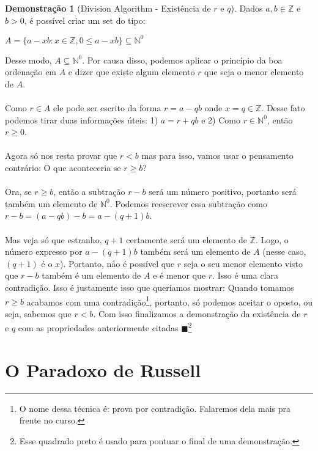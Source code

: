\documentclass[a4paper,11pt]{book}
\theoremstyle{definition}
\newtheorem{demonstration}{Demonstração}[section]
\begin{document}
\begin{demonstration}[Division Algorithm - Existência de $r$ e $q$]
Dados $a,b \in \mathbb{Z}$ e $b > 0$, é possível criar um set do tipo:
\begin{center}
	$ A = \{ a - xb : x \in \mathbb{Z}, 0 \leq a - xb \} \subseteq \mathbb{N}^0 $
\end{center}
Desse modo, $A \subseteq \mathbb{N}^0$. Por causa disso, podemos aplicar o princípio da boa ordenação em $A$ e dizer que existe algum elemento $r$ que seja o menor elemento de $A$.
\\
\\
Como $r \in A$ ele pode ser escrito da forma $r = a - qb$ onde $x = q \in \mathbb{Z}$. Desse fato podemos tirar duas informações úteis: 1) $a = r + qb$ e 2) Como $r \in \mathbb{N}^0$, então $r \geq 0$.
\\
\\
Agora só nos resta provar que $r < b$ mas para isso, vamos usar o pensamento contrário: O que aconteceria se $r \geq b$?
\\
\\
Ora, se $r \geq b$, então a subtração $r - b$ será um número positivo, portanto será também um elemento de $\mathbb{N}^0$. Podemos reescrever essa subtração como $r - b = (a - qb) - b = a - (q + 1)b$. 
\\
\\
Mas veja só que estranho, $q + 1$ certamente será um elemento de $\mathbb{Z}$. Logo, o número expresso por $a - (q + 1)b$ também será um elemento de $A$ (nesse caso, $(q + 1)$ é o $x$). Portanto, não é possível que $r$ seja o seu menor elemento visto que $r - b$ também é um elemento de $A$ e é menor que $r$. Isso é uma clara contradição. Isso é justamente isso que queríamos mostrar: Quando tomamos $r \geq b$ acabamos com uma contradição\footnote{O nome dessa técnica é: prova por contradição. Falaremos dela mais pra frente no curso.}, portanto, só podemos aceitar o oposto, ou seja, sabemos que $r < b$. Com isso finalizamos a demonstração da existência de $r$ e $q$ com as propriedades anteriormente citadas $\blacksquare$\footnote{Esse quadrado preto é usado para pontuar o final de uma demonstração.}
\end{demonstration}

\section{O Paradoxo de Russell}
\end{document}
